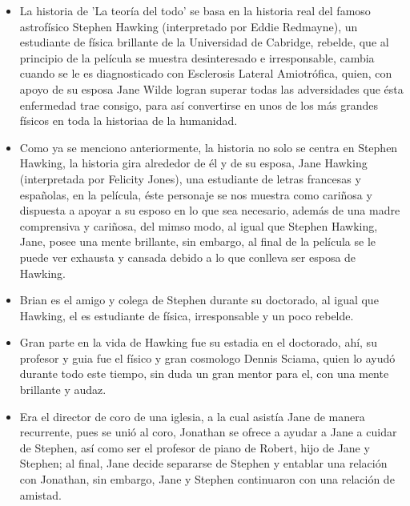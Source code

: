 \documentclass[a5paper, 11pt]{article}
\begin{document}
        \small{
    
        \begin{itemize}\renewcommand{\labelitemi}{$\propto$}
        
            \item {} La historia de 'La teoría del todo' se basa en la historia real del famoso astrofísico Stephen Hawking (interpretado por Eddie Redmayne), un estudiante de física brillante de la Universidad de Cabridge, rebelde, que al principio de la película se muestra desinteresado e irresponsable, cambia cuando se le es diagnosticado con Esclerosis Lateral Amiotrófica, quien, con apoyo de su esposa Jane Wilde logran superar todas las adversidades que ésta enfermedad trae consigo, para así convertirse en unos de los más grandes físicos en toda la historiaa de la humanidad.
            
            \item {} Como ya se menciono anteriormente, la historia no solo se centra en Stephen Hawking, la historia gira alrededor de él y de su esposa, Jane Hawking (interpretada por Felicity Jones), una estudiante de letras francesas y españolas,  en la película, éste personaje se nos muestra como cariñosa y dispuesta a apoyar a su esposo en lo que sea necesario, además de una madre comprensiva y cariñosa, del mimso modo, al igual  que Stephen Hawking, Jane, posee una mente brillante, sin embargo, al final de la película se le puede ver exhausta y cansada debido a lo que conlleva ser esposa de Hawking. 
            
            \item {} Brian es el amigo y colega de Stephen durante su doctorado, al igual que Hawking, el es estudiante de física, irresponsable y un poco rebelde. 
            
            \item {} Gran parte en la vida de Hawking fue su estadia en el doctorado, ahí, su profesor y guia fue el físico y gran cosmologo Dennis Sciama, quien lo ayudó durante todo este tiempo, sin duda un gran mentor para el, con una mente brillante y audaz.
            
            \item {} Era el director de coro de una iglesia, a la cual asistía Jane de manera recurrente, pues se unió al coro, Jonathan se ofrece a ayudar a Jane a cuidar de Stephen, así como ser el profesor de piano de Robert, hijo de Jane y Stephen; al final, Jane decide separarse de Stephen y entablar una relación con Jonathan, sin embargo, Jane y Stephen continuaron con una relación de amistad. 
            

\end{itemize}}
\end{document}
